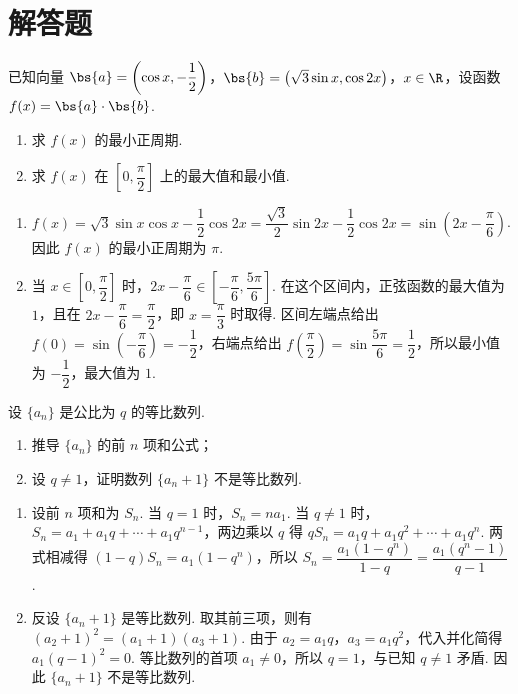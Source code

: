 \section{解答题}

\begin{problem}
已知向量 \(\bs{a}=\left(\cos x,-\dfrac12\right)\)，\(\bs{b}=\left(\sqrt3\sin x,\cos2x\right)\)，\(x\in\R\)，设函数 \(f(x)=\bs{a}\cdot\bs{b}\).

\begin{enumerate}
\item 求 \(f(x)\) 的最小正周期.
\item 求 \(f(x)\) 在 \(\left[0,\dfrac\pi2\right]\) 上的最大值和最小值.
\end{enumerate}

\end{problem}

\begin{solution}
\begin{enumerate}
\item \(f(x)=\sqrt3\sin x\cos x-\dfrac12\cos2x=\dfrac{\sqrt3}{2}\sin2x-\dfrac12\cos2x=\sin\left(2x-\dfrac\pi6\right)\). 因此 \(f(x)\) 的最小正周期为 \(\pi\).
\item 当 \(x\in\left[0,\dfrac\pi2\right]\) 时，\(2x-\dfrac\pi6\in\left[-\dfrac\pi6,\dfrac{5\pi}6\right]\). 在这个区间内，正弦函数的最大值为 \(1\)，且在 \(2x-\dfrac\pi6=\dfrac\pi2\)，即 \(x=\dfrac\pi3\) 时取得. 区间左端点给出 \(f(0)=\sin\left(-\dfrac\pi6\right)=-\dfrac12\)，右端点给出 \(f\left(\dfrac\pi2\right)=\sin\dfrac{5\pi}6=\dfrac12\)，所以最小值为 \(-\dfrac12\)，最大值为 \(1\).
\end{enumerate}
\end{solution}

\begin{problem}
设 \(\{a_n\}\) 是公比为 \(q\) 的等比数列.

\begin{enumerate}
\item 推导 \(\{a_n\}\) 的前 \(n\) 项和公式；
\item 设 \(q\neq1\)，证明数列 \(\{a_n+1\}\) 不是等比数列.
\end{enumerate}

\end{problem}

\begin{solution}
\begin{enumerate}
\item 设前 \(n\) 项和为 \(S_n\). 当 \(q=1\) 时，\(S_n=na_1\). 当 \(q\neq1\) 时，\(S_n=a_1+a_1q+\cdots+a_1q^{n-1}\)，两边乘以 \(q\) 得 \(qS_n=a_1q+a_1q^2+\cdots+a_1q^n\). 两式相减得 \((1-q)S_n=a_1(1-q^n)\)，所以 \(S_n=\dfrac{a_1(1-q^n)}{1-q}=\dfrac{a_1(q^n-1)}{q-1}\).
\item 反设 \(\{a_n+1\}\) 是等比数列. 取其前三项，则有 \((a_2+1)^2=(a_1+1)(a_3+1)\). 由于 \(a_2=a_1q\)，\(a_3=a_1q^2\)，代入并化简得 \(a_1(q-1)^2=0\). 等比数列的首项 \(a_1\neq0\)，所以 \(q=1\)，与已知 \(q\neq1\) 矛盾. 因此 \(\{a_n+1\}\) 不是等比数列.
\end{enumerate}
\end{solution}

